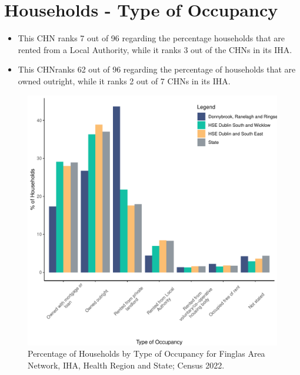 \documentclass{article}
\begin{document}
\section{Households - Type of Occupancy}\label{sect:Households}
\begin{itemize}
\item This CHN ranks  7 out of 96 regarding the percentage households that are rented from a Local Authority, while it ranks  3 out of the CHNs in its IHA. 
\item This CHNranks  62 out of 96 regarding the percentage of households that are owned outright, while it ranks   2 out of 7 CHNs in its IHA.
\end{itemize}
\begin{figure}[H]
	\centering
	\includegraphics[width = 140mm]{../figures/HouseholdsED.pdf}
	\caption{Percentage of Households by Type of Occupancy for Finglas Area Network, IHA, Health Region and State; Census 2022.}
	\label{fig:vbnv}
	\end{figure}
\end{document}
